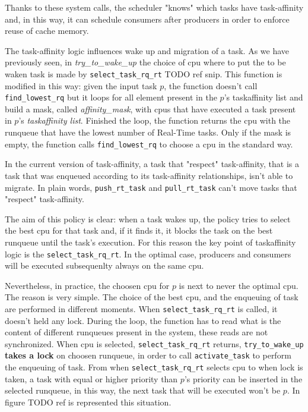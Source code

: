 Thanks to these system calls, the scheduler "knows" which tasks have task-affinity and, in this way, it can schedule consumers after producers in order to 
enforce reuse of cache memory.

The task-affinity logic influences wake up and migration of a task. As we have previously seen, in \textit{try\_to\_wake\_up} the choice of cpu where to 
put the to be waken task is made by \texttt{select\_task\_rq\_rt} TODO ref snip. This function is modified in this way: given the input task $p$, the 
function doesn't call \texttt{find\_lowest\_rq} but it loops for all element present in the $p$'s taskaffinity list and build a mask, called 
\textit{affinity\_mask}, with cpus that have executed a task present in $p$'s \textit{taskaffinity list}. Finished the loop, the function returns the cpu 
with the runqueue that have the lowest number of Real-Time tasks. Only if the mask is empty, the function calls \texttt{find\_lowest\_rq} to choose a cpu
in the standard way. 

In the current version of task-affinity, a task that "respect" task-affinity, that is a task that was enqueued according to its task-affinity 
relationships, isn't able to migrate. In plain words, \texttt{push\_rt\_task} and \texttt{pull\_rt\_task} can't move tasks that "respect" task-affinity.

The aim of this policy is clear: when a task wakes up, the policy tries to select the best cpu for that task and, if it finds it, it blocks the task on the 
best runqueue until the task's execution. For this reason the key point of taskaffinity logic is the \texttt{select\_task\_rq\_rt}. In the optimal case, 
producers and consumers will be executed subsequenlty always on the same cpu.

Nevertheless, in practice, the choosen cpu for $p$ is next to never the optimal cpu. The reason is very simple. The choice of the best 
cpu, and the enqueuing of task are performed in different moments. When \texttt{select\_task\_rq\_rt} is called, it doesn't held any lock. During the loop, 
the function has to read what is the content of different runqueues present in the system, these reads are not synchronized. When cpu is selected, 
\texttt{select\_task\_rq\_rt} returns, \texttt{try\_to\_wake\_up} \textbf{takes a lock} on choosen runqueue, in order to call \texttt{activate\_task} 
to perform the enqueuing of task. From when \texttt{select\_task\_rq\_rt} selects cpu to when lock is taken, a task with equal or higher priority than 
$p$'s priority can be inserted in the selected runqueue, in this way, the next task that will be executed won't be $p$. In figure TODO ref is represented 
this situation.

